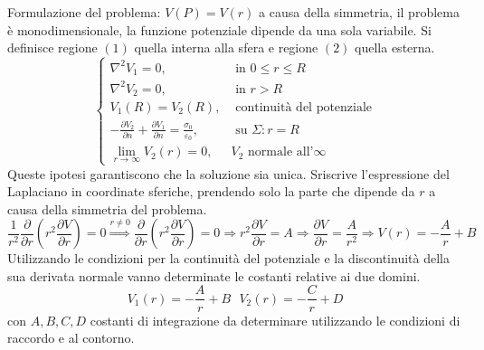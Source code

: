 Formulazione del problema: $V(P) = V(r)$ a causa della simmetria, il problema
è monodimensionale, la funzione potenziale dipende da una sola variabile.
Si definisce regione $(1)$ quella interna alla sfera e regione $(2)$ quella esterna.
$$\begin{cases}
\nabla^2 V_1 = 0, & \text{ in } 0\leq r\leq R \\
\nabla^2 V_2 = 0, & \text{ in } r > R \\
V_1(R) = V_2(R), &\text{ continuità del potenziale} \\
-\frac{\partial V_2}{\partial n} + \frac{\partial V_1}{\partial n} = \frac{\sigma_0}{\varepsilon_0}, & \text{ su } \Sigma : r=R \\
\lim_{r\to\infty} V_2(r) = 0, & V_2 \text{ normale all'}\infty
\end{cases}
$$
Queste ipotesi garantiscono che la soluzione sia unica.
Sriscrive l'espressione del Laplaciano in coordinate sferiche, prendendo solo la parte
che dipende da $r$ a causa della simmetria del problema.
$$
\frac{1}{r^2}\frac{\partial}{\partial r} \left(r^2 \frac{\partial V}{\partial r}\right) = 0 \stackrel{r\neq 0}{\Rightarrow} \frac{\partial}{\partial r} \left(r^2 \frac{\partial V}{\partial r}\right) = 0 \Rightarrow r^2 \frac{\partial V}{\partial r} = A \Rightarrow
\frac{\partial V}{\partial r} = \frac{A}{r^2} \Rightarrow V(r) = -\frac{A}{r} + B
$$
Utilizzando le condizioni per la continuità del potenziale e la discontinuità della
sua derivata normale vanno determinate le costanti relative ai due domini.
$$
V_1(r) = -\frac{A}{r} + B \ \ \ V_2(r) = -\frac{C}{r} + D
$$
con $A,B,C,D$ costanti di integrazione da determinare utilizzando le condizioni
di raccordo e al contorno.
